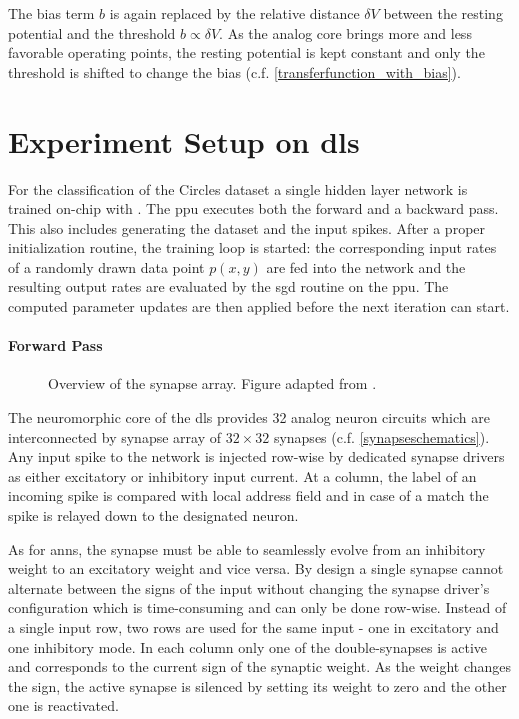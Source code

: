 The bias term $b$ is again replaced by the relative distance $\delta V$ between the resting potential and the threshold $b \propto \delta V$. As the analog core brings more and less favorable operating points, the resting potential is kept constant and only the threshold is shifted to change the bias (c.f. \cref{transferfunction_with_bias}).



\section{Experiment Setup on \gls{dls}}
\label{circlesimplementation}
For the classification of the Circles dataset a single hidden layer network is trained on-chip with . The \gls{ppu} executes both the forward and a backward pass. This also includes generating the dataset and the input spikes. After a proper initialization routine, the training loop is started: the corresponding input rates of a randomly drawn data point $p(x,y)$ are fed into the network and the resulting output rates are evaluated by the \gls{sgd} routine on the \gls{ppu}. The computed parameter updates are then applied before the next iteration can start.

\paragraph{Forward Pass}

\begin{wrapfigure}{R}{0.35\textwidth}
	\centering
	\vspace{-1cm}
	
	\caption[Overview of the synapse array.]{Overview of the synapse array. Figure adapted from \cite{billaudelle2019versatile}.} 
	\label{synapsearraysketch}
	\vspace{-1cm}
\end{wrapfigure}
The neuromorphic core of the \gls{dls} provides 32 analog neuron circuits which are interconnected by synapse array of $32 \times 32$ synapses (c.f. \cref{synapseschematics}). Any input spike to the network is injected row-wise by dedicated synapse drivers as either excitatory or inhibitory input current. At a column, the label of an incoming spike is compared with local address field and in case of a match the spike is relayed down to the designated neuron.

As for \glspl{ann}, the synapse must be able to seamlessly evolve from an inhibitory weight to an excitatory weight and vice versa. By design a single synapse cannot alternate between the signs of the input without changing the synapse driver's configuration which is time-consuming and can only be done row-wise. Instead of a single input row, two rows are used for the same input - one in excitatory and one inhibitory mode. In each column only one of the double-synapses is active and corresponds to the current sign of the synaptic weight. As the weight changes the sign, the active synapse is silenced by setting its weight to zero and the other one is reactivated. 

